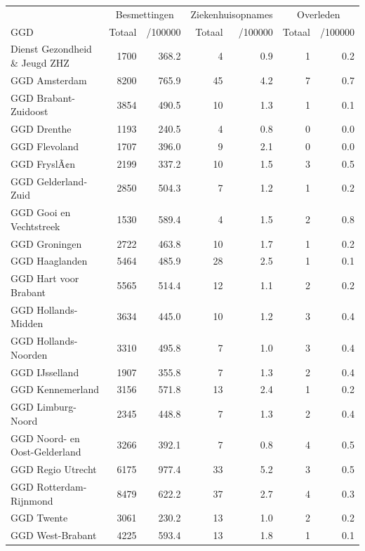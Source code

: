 \documentclass[
  english,
  man,floatsintext]{apa6}
\begin{document}
\begin{table}
\centering\begingroup\fontsize{10}{12}\selectfont

\begin{threeparttable}
\begin{tabular}{lrrrrrr}
\toprule
\multicolumn{1}{c}{ } & \multicolumn{2}{c}{Besmettingen} & \multicolumn{2}{c}{Ziekenhuisopnames} & \multicolumn{2}{c}{Overleden} \\
\cmidrule(l{3pt}r{3pt}){2-3} \cmidrule(l{3pt}r{3pt}){4-5} \cmidrule(l{3pt}r{3pt}){6-7}
GGD & Totaal & /100000 & Totaal & /100000 & Totaal & /100000\\
\midrule
Dienst Gezondheid \& Jeugd ZHZ & 1700 & 368.2 & 4 & 0.9 & 1 & 0.2\\
GGD Amsterdam & 8200 & 765.9 & 45 & 4.2 & 7 & 0.7\\
GGD Brabant-Zuidoost & 3854 & 490.5 & 10 & 1.3 & 1 & 0.1\\
GGD Drenthe & 1193 & 240.5 & 4 & 0.8 & 0 & 0.0\\
GGD Flevoland & 1707 & 396.0 & 9 & 2.1 & 0 & 0.0\\
GGD FryslÃ¢n & 2199 & 337.2 & 10 & 1.5 & 3 & 0.5\\
GGD Gelderland-Zuid & 2850 & 504.3 & 7 & 1.2 & 1 & 0.2\\
GGD Gooi en Vechtstreek & 1530 & 589.4 & 4 & 1.5 & 2 & 0.8\\
GGD Groningen & 2722 & 463.8 & 10 & 1.7 & 1 & 0.2\\
GGD Haaglanden & 5464 & 485.9 & 28 & 2.5 & 1 & 0.1\\
GGD Hart voor Brabant & 5565 & 514.4 & 12 & 1.1 & 2 & 0.2\\
GGD Hollands-Midden & 3634 & 445.0 & 10 & 1.2 & 3 & 0.4\\
GGD Hollands-Noorden & 3310 & 495.8 & 7 & 1.0 & 3 & 0.4\\
GGD IJsselland & 1907 & 355.8 & 7 & 1.3 & 2 & 0.4\\
GGD Kennemerland & 3156 & 571.8 & 13 & 2.4 & 1 & 0.2\\
GGD Limburg-Noord & 2345 & 448.8 & 7 & 1.3 & 2 & 0.4\\
GGD Noord- en Oost-Gelderland & 3266 & 392.1 & 7 & 0.8 & 4 & 0.5\\
GGD Regio Utrecht & 6175 & 977.4 & 33 & 5.2 & 3 & 0.5\\
GGD Rotterdam-Rijnmond & 8479 & 622.2 & 37 & 2.7 & 4 & 0.3\\
GGD Twente & 3061 & 230.2 & 13 & 1.0 & 2 & 0.2\\
GGD West-Brabant & 4225 & 593.4 & 13 & 1.8 & 1 & 0.1\\

\end{tabular}
\end{threeparttable}
\end{table}
\end{document}
